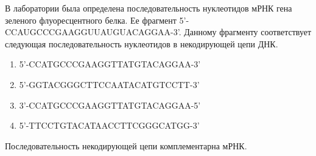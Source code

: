
В лаборатории была определена последовательность нуклеотидов мРНК гена
зеленого флуоресцентного белка. Ее фрагмент 5'-CCAUGCCCGAAGGUUAUGUACAGGAA-3'.
Данному фрагменту соответствует следующая последовательность нуклеотидов в
некодирующей цепи ДНК.

\begin{enumerate}
    \item 5'-CCATGCCCGAAGGTTATGTACAGGAA-3'
    \item 5'-GGTACGGGCTTCCAATACATGTCCTT-3'
    \item 3’-CCATGCCCGAAGGTTATGTACAGGAA-5’
    \item 5’-TTCCTGTACATAACCTTCGGGCATGG-3’
\end{enumerate}


\explanationSection

Последовательность некодирующей цепи комплементарна мРНК.

